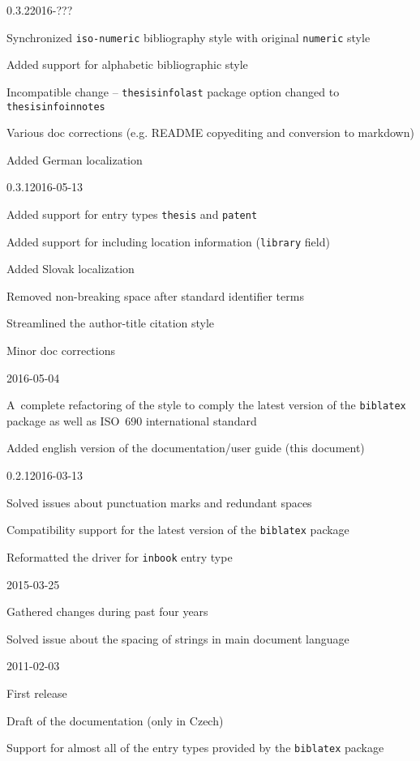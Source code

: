 \documentclass[a4paper,10pt]{ltxdockit}
\def\t|#1|{\texttt{#1}}
\begin{document}
\begin{changelog}

\begin{release}{0.3.2}{2016-???}
\item Synchronized \t|iso-numeric| bibliography style with original \t|numeric| style
\item Added support for alphabetic bibliographic style
\item Incompatible change -- \t|thesisinfolast| package option changed to \t|thesisinfoinnotes|
\item Various doc corrections (e.g. README copyediting and conversion to markdown)
\item Added German localization
\end{release}

\begin{release}{0.3.1}{2016-05-13}
\item Added support for entry types \t|thesis| and \t|patent|
\item Added support for including location information (\t|library| field)
\item Added Slovak localization
\item Removed non-breaking space after standard identifier terms
\item Streamlined the author-title citation style
\item Minor doc corrections
\end{release}

\begin{release}{0.3}{2016-05-04}
\item A~complete refactoring of the style to comply the latest version of the \t|biblatex| package as well as ISO~690 international standard
\item Added english version of the documentation/user guide (this document)
\end{release}

\begin{release}{0.2.1}{2016-03-13}
\item Solved issues about punctuation marks and redundant spaces
\item Compatibility support for the latest version of the \t|biblatex| package
\item Reformatted the driver for \verb|inbook| entry type
\end{release}

\begin{release}{0.2}{2015-03-25}
\item Gathered changes during past four years
\item Solved issue about the spacing of strings in main document language
\end{release}

\begin{release}{0.1}{2011-02-03}
\item First release
\item Draft of the documentation (only in Czech)
\item Support for almost all of the entry types provided by the \t|biblatex| package
\end{release}

\end{changelog}
\end{document}
